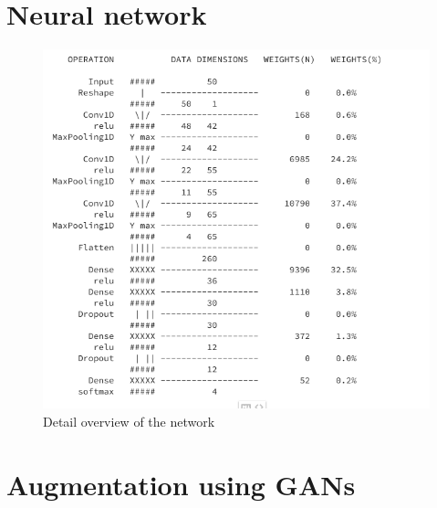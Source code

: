\chapter{Neural network}
\begin{figure}[ht]
	\begin{center}
		\includegraphics[width=\textwidth]{images/neural_overview.png}
		\caption{Detail overview of the network}
		\label{fig:neural network architecture}
		
	\end{center}
\end{figure}


\chapter{Augmentation using GANs}
\label{chapter:third-appendix}
\lstset{language=Python, caption=Implimentation of GANs,label=GAN}


